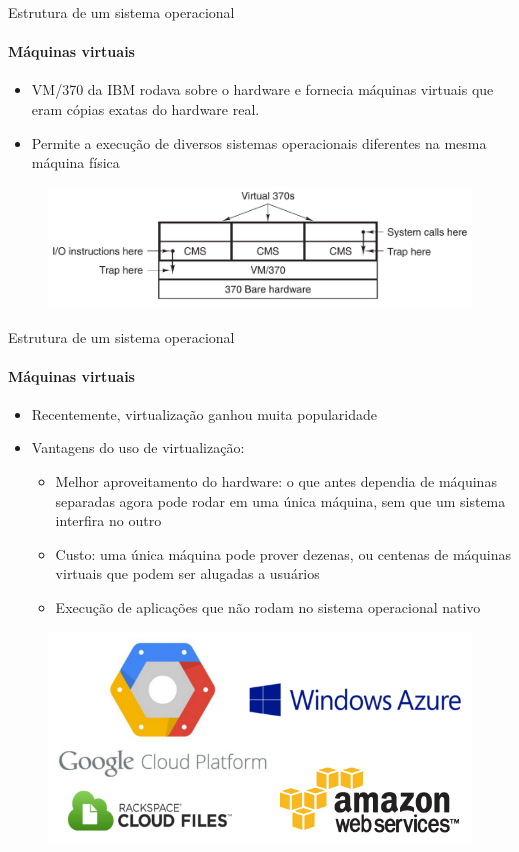 \documentclass{beamer}
\begin{document}
\begin{frame}{Estrutura de um sistema operacional}
	\framesubtitle{Máquinas virtuais}
	\begin{itemize}
		\item VM/370 da IBM rodava sobre o hardware e fornecia máquinas virtuais que eram cópias exatas do hardware real.
		\item Permite a execução de diversos sistemas operacionais diferentes na mesma máquina física
	\end{itemize}
	\begin{figure}
		\includegraphics[width=0.7\paperwidth]{resources/vm}
	\end{figure}
\end{frame}
\begin{frame}{Estrutura de um sistema operacional}
	\framesubtitle{Máquinas virtuais}
	\begin{itemize}
		\item Recentemente, virtualização ganhou muita popularidade
		\item Vantagens do uso de virtualização:
		\begin{itemize}
			\item Melhor aproveitamento do hardware: o que antes dependia de máquinas separadas agora pode rodar em uma única máquina, sem que um sistema interfira no outro
			\item Custo: uma única máquina pode prover dezenas, ou centenas de máquinas virtuais que podem ser alugadas a usuários
			\item Execução de aplicações que não rodam no sistema operacional nativo
		\end{itemize}
	\end{itemize}
	\begin{figure}
		\includegraphics[width=0.35\paperwidth]{resources/cloudproviders}
	\end{figure}
\end{frame}
\end{document}
